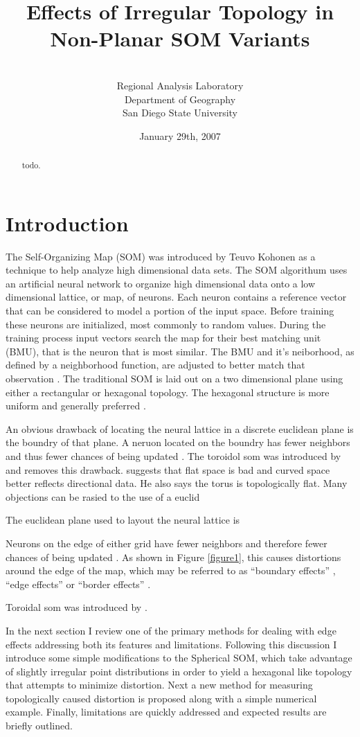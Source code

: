 \documentclass[12pt]{article}
\title{Effects of Irregular Topology in Non-Planar SOM Variants}
\author{\sc{Charles R. Schmidt}\\Regional Analysis Laboratory\\Department of Geography\\San Diego State University}
\date{January 29th, 2007}
\begin{document}
\maketitle
\begin{abstract}
todo.
\end{abstract}
\section{Introduction}
The Self-Organizing Map (SOM) was introduced by Teuvo Kohonen as a technique to
help analyze high dimensional data sets. The SOM algorithum uses an artificial
neural network to organize high dimensional data onto a low dimensional lattice,
or map, of neurons.  Each neuron contains a reference vector that can be
considered to model a portion of the input space. Before training these neurons
are initialized, most commonly to random values.  During the training process
input vectors search the map for their best matching unit (BMU), that is the
neuron that is most similar. The BMU and it's neiborhood, as defined by a
neighborhood function, are adjusted to better match that observation
\citep{Kohonen2000}.  The traditional SOM is laid out on a two dimensional plane
using either a rectangular or hexagonal topology.  The hexagonal structure is
more uniform and generally preferred \citep{Wu:2006lr}.

An obvious drawback of locating the neural lattice in a discrete euclidean plane
is the boundry of that plane.  A neruon located on the boundry has fewer
neighbors and thus fewer chances of being updated \citep{Wu:2006lr}.  The
toroidol som was introduced by \cite{li1993} and removes this drawback.
\cite{ritter99} suggests that flat space is bad and curved space better reflects
directional data.  He also says the torus is topologically flat.
Many objections can be rasied to the use of a euclid

The euclidean plane used to layout the neural lattice is 



Neurons on the edge of either grid have fewer neighbors and therefore fewer
chances of being updated \citep{Wu:2006lr}.  As shown in Figure \ref{figure1},
this causes distortions around the edge of the map, which may be referred to as
``boundary effects'' \citep{ritter99}, ``edge effects'' \citep{boudjemai2003} or
``border effects'' \citep{Wu:2006lr}.

Toroidal som was introduced by \citep{li1993}.


In the next section I review one of the primary methods for dealing with edge
effects addressing both its features and limitations.  Following this
discussion I introduce some simple modifications to the Spherical SOM, which
take advantage of slightly irregular point distributions in order to yield a
hexagonal like topology that attempts to minimize distortion.  Next a new
method for measuring topologically caused distortion is proposed along with a
simple numerical example.  Finally, limitations are quickly addressed and
expected results are briefly outlined.
\end{document}
